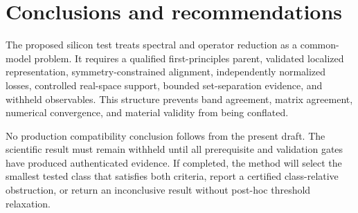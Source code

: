 \documentclass[11pt]{article}
\newenvironment{prospective}{\color{prospectivered}}{}
\begin{document}
\begin{prospective}
\section{Conclusions and recommendations}
The proposed silicon test treats spectral and operator reduction as a common-model problem. It requires a qualified first-principles parent, validated localized representation, symmetry-constrained alignment, independently normalized losses, controlled real-space support, bounded set-separation evidence, and withheld observables. This structure prevents band agreement, matrix agreement, numerical convergence, and material validity from being conflated.

No production compatibility conclusion follows from the present draft. The scientific result must remain withheld until all prerequisite and validation gates have produced authenticated evidence. If completed, the method will select the smallest tested class that satisfies both criteria, report a certified class-relative obstruction, or return an inconclusive result without post-hoc threshold relaxation.

\end{prospective}
\end{document}
